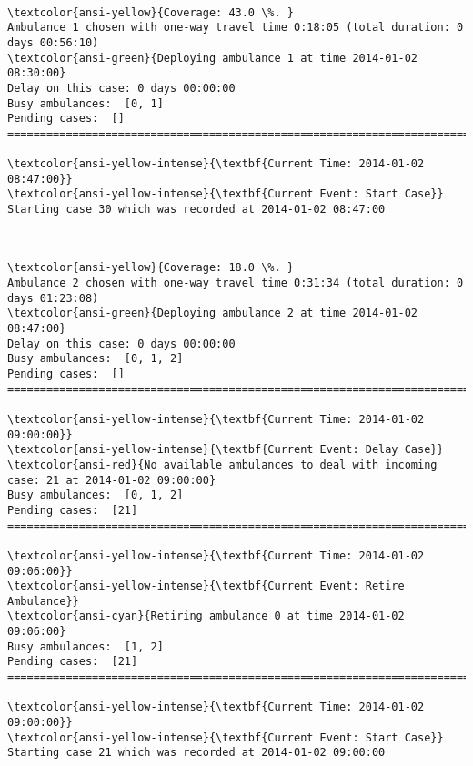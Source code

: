 \documentclass[11pt]{article}
\begin{document}
    \begin{center}
    \end{center}
    { \hspace*{\fill} \\}
    
    \begin{Verbatim}[commandchars=\\\{\}]
\textcolor{ansi-yellow}{Coverage: 43.0 \%. }
Ambulance 1 chosen with one-way travel time 0:18:05 (total duration: 0 days 00:56:10)
\textcolor{ansi-green}{Deploying ambulance 1 at time 2014-01-02 08:30:00}
Delay on this case: 0 days 00:00:00
Busy ambulances:  [0, 1]
Pending cases:  []
========================================================================

\textcolor{ansi-yellow-intense}{\textbf{Current Time: 2014-01-02 08:47:00}}
\textcolor{ansi-yellow-intense}{\textbf{Current Event: Start Case}}
Starting case 30 which was recorded at 2014-01-02 08:47:00

    \end{Verbatim}

    \begin{center}
    \end{center}
    { \hspace*{\fill} \\}
    
    \begin{Verbatim}[commandchars=\\\{\}]
\textcolor{ansi-yellow}{Coverage: 18.0 \%. }
Ambulance 2 chosen with one-way travel time 0:31:34 (total duration: 0 days 01:23:08)
\textcolor{ansi-green}{Deploying ambulance 2 at time 2014-01-02 08:47:00}
Delay on this case: 0 days 00:00:00
Busy ambulances:  [0, 1, 2]
Pending cases:  []
========================================================================

\textcolor{ansi-yellow-intense}{\textbf{Current Time: 2014-01-02 09:00:00}}
\textcolor{ansi-yellow-intense}{\textbf{Current Event: Delay Case}}
\textcolor{ansi-red}{No available ambulances to deal with incoming case: 21 at 2014-01-02 09:00:00}
Busy ambulances:  [0, 1, 2]
Pending cases:  [21]
========================================================================

\textcolor{ansi-yellow-intense}{\textbf{Current Time: 2014-01-02 09:06:00}}
\textcolor{ansi-yellow-intense}{\textbf{Current Event: Retire Ambulance}}
\textcolor{ansi-cyan}{Retiring ambulance 0 at time 2014-01-02 09:06:00}
Busy ambulances:  [1, 2]
Pending cases:  [21]
========================================================================

\textcolor{ansi-yellow-intense}{\textbf{Current Time: 2014-01-02 09:00:00}}
\textcolor{ansi-yellow-intense}{\textbf{Current Event: Start Case}}
Starting case 21 which was recorded at 2014-01-02 09:00:00

    \end{Verbatim}
\end{document}
